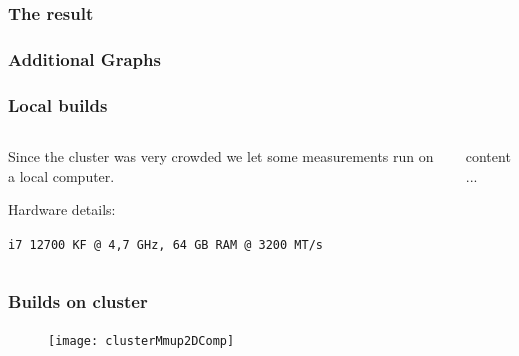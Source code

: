 \begin{frame}
	\frametitle{The result}
	\begin{figure}[h!]
		\centering    
	\end{figure} 
\end{frame}


\begin{frame}
	\frametitle{Additional Graphs}
	\PraesentationBildUhrenturm
\end{frame}

\begin{frame}
	\frametitle{Local builds}
	\vspace{0.8cm}
	\begin{columns}
		\begin{column}{0.4\linewidth}
			\large
			Since the cluster was very crowded we let some measurements run on a local computer.
			
			Hardware details:
			
			\texttt{i7 12700 KF @ 4,7 GHz, 64 GB RAM @ 3200 MT/s}
		\end{column}
		\begin{column}{0.6\linewidth}
			content...
		\end{column}
	\end{columns}
	
	
	
\end{frame}

\begin{frame}
	\frametitle{Builds on cluster}
	\begin{figure}
		\centering
		\texttt{[image: clusterMmup2DComp]}
		\label{fig:clustermmup2dcomp}
	\end{figure}
	
\end{frame}


